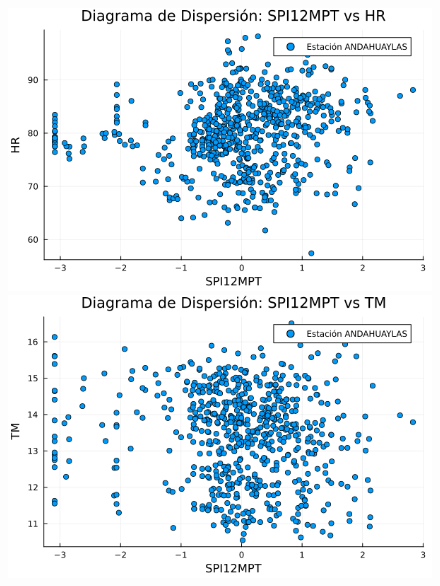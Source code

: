 \begin{figure}[H]
\vspace{0.3cm}  %

\begin{minipage}{0.33\textwidth}
    \centering
    \includegraphics[width=\linewidth]{Capitulos/Scaterplot/ANDAHUAYLAS_SPI12MPT_vs_HR.png}
\end{minipage}\hfill
\begin{minipage}{0.33\textwidth}
    \centering
    \includegraphics[width=\linewidth]{Capitulos/Scaterplot/ANDAHUAYLAS_SPI12MPT_vs_TM.png}
\end{minipage}\hfill
\begin{minipage}{0.33\textwidth}
    \centering

\end{minipage}
\end{figure}
